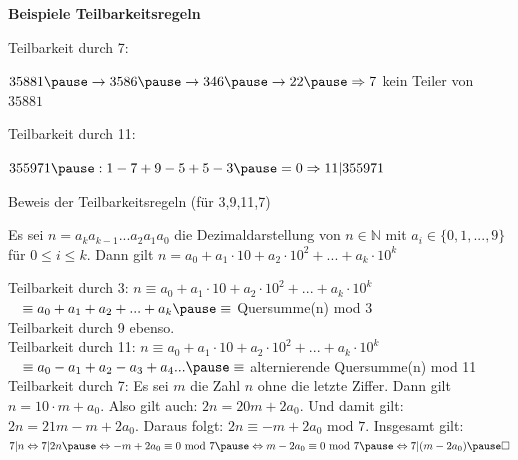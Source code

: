 \begin{frame}[fragile]
\textbf{Beispiele Teilbarkeitsregeln} 

Teilbarkeit durch 7:

$35881 \pause  \rightarrow 3586 \pause  \rightarrow 346 \pause \rightarrow 22 \pause \Rightarrow 7$ kein Teiler von $35881$

Teilbarkeit durch 11:

$355971 \pause : 1-7+9-5+5-3 \pause =  0 \Rightarrow 11|355971$

\end{frame}

\begin{frame}[fragile]
Beweis der Teilbarkeitsregeln (für 3,9,11,7)

Es sei $n = a_ka_{k-1}...a_2a_1a_0$ die Dezimaldarstellung von $n \in \mathbb{N}$ mit $a_i \in \{0,1,...,9\}$ für $0 \le i \le k$.
Dann gilt $n = a_0 + a_1 \cdot 10 + a_2 \cdot 10^2 + ... + a_k \cdot 10^k$  \pause

Teilbarkeit durch 3: $n \equiv a_0 + a_1 \cdot 10 + a_2 \cdot 10^2 + ... + a_k \cdot 10^k$ \\ \pause
$\quad \equiv a_0 + a_1 + a_2  + ... + a_k \pause \equiv$  Quersumme(n) mod 3 \\ \pause
Teilbarkeit durch 9 \pause ebenso. \\ \pause
Teilbarkeit durch 11: $n \equiv a_0 + a_1 \cdot 10 + a_2 \cdot 10^2 + ... + a_k \cdot 10^k$ \\ \pause
$\quad \equiv a_0 - a_1 + a_2  - a_3 + a_4 ... \pause \equiv$  alternierende Quersumme(n) mod 11 \\ \pause
Teilbarkeit durch 7: \pause Es sei $m$ die Zahl $n$ ohne die letzte Ziffer. \pause Dann gilt $n = 10 \cdot m + a_0$. \pause Also gilt auch: 
$2n = 20m + 2a_0$. \pause Und damit gilt: $2n = 21m - m + 2a_0$. \pause
Daraus folgt: $2n \equiv -m +2a_0 \text{ mod }7$. \pause Insgesamt gilt: 
$7|n \Leftrightarrow 7|2n \pause \Leftrightarrow   \Mod{-m +2a_0 }{0}{7} \pause \Leftrightarrow   \Mod{m -2a_0 }{0}{7} \pause \Leftrightarrow 7|(m-2a_0) \pause \square{}$

\end{frame}

